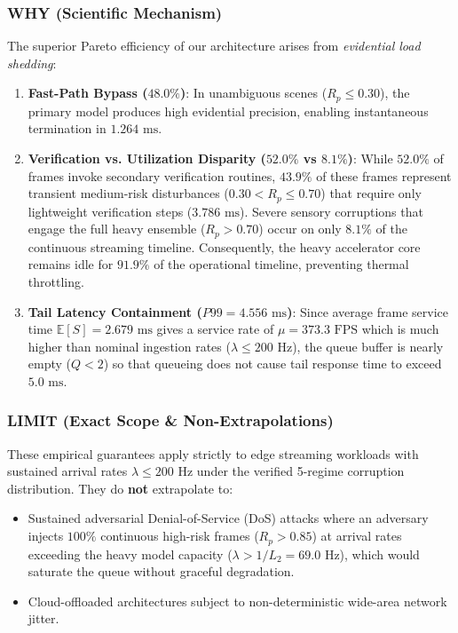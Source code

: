 \documentclass[conference]{IEEEtran}
\begin{document}
\subsubsection{WHY (Scientific Mechanism)}
The superior Pareto efficiency of our architecture arises from \textit{evidential load shedding}:
\begin{enumerate}
    \item \textbf{Fast-Path Bypass ($48.0\%$)}: In unambiguous scenes ($R_p \le 0.30$), the primary model produces high evidential precision, enabling instantaneous termination in $1.264\text{ ms}$.
    \item \textbf{Verification vs. Utilization Disparity ($52.0\%$ vs $8.1\%$)}: While $52.0\%$ of frames invoke secondary verification routines, $43.9\%$ of these frames represent transient medium-risk disturbances ($0.30 < R_p \le 0.70$) that require only lightweight verification steps ($3.786\text{ ms}$). Severe sensory corruptions that engage the full heavy ensemble ($R_p > 0.70$) occur on only $8.1\%$ of the continuous streaming timeline. Consequently, the heavy accelerator core remains idle for $91.9\%$ of the operational timeline, preventing thermal throttling.
    \item \textbf{Tail Latency Containment ($P99 = 4.556\text{ ms}$)}: Since average frame service time $\mathbb{E}[S] = 2.679\text{ ms}$ gives a service rate of $\mu = 373.3\text{ FPS}$ which is much higher than nominal ingestion rates ($\lambda \le 200\text{ Hz}$), the queue buffer is nearly empty ($Q < 2$) so that queueing does not cause tail response time to exceed $5.0\text{ ms}$.
\end{enumerate}

\subsubsection{LIMIT (Exact Scope \& Non-Extrapolations)}
These empirical guarantees apply strictly to edge streaming workloads with sustained arrival rates $\lambda \le 200\text{ Hz}$ under the verified 5-regime corruption distribution. They do \textbf{not} extrapolate to:
\begin{itemize}
    \item Sustained adversarial Denial-of-Service (DoS) attacks where an adversary injects $100\%$ continuous high-risk frames ($R_p > 0.85$) at arrival rates exceeding the heavy model capacity ($\lambda > 1 / L_2 = 69.0\text{ Hz}$), which would saturate the queue without graceful degradation.
    \item Cloud-offloaded architectures subject to non-deterministic wide-area network jitter.
\end{itemize}
\end{document}
